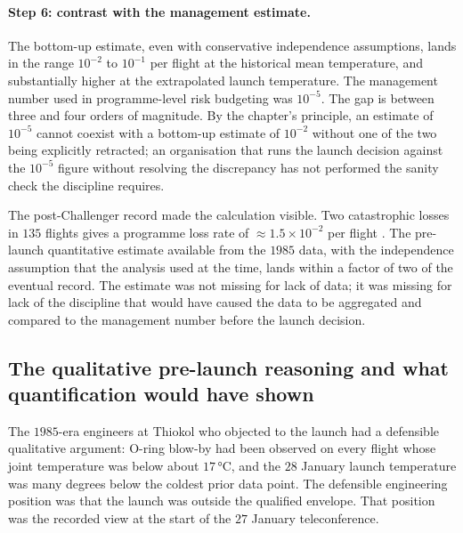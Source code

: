 \paragraph{Step 6: contrast with the management estimate.}
The bottom-up estimate, even with conservative independence
assumptions, lands in the range $10^{-2}$ to $10^{-1}$ per flight
at the historical mean temperature, and substantially higher at
the extrapolated launch temperature. The management number used in
programme-level risk budgeting was $10^{-5}$. The gap is between
three and four orders of magnitude. By the chapter's principle, an
estimate of $10^{-5}$ cannot coexist with a bottom-up estimate of
$10^{-2}$ without one of the two being explicitly retracted; an
organisation that runs the launch decision against the $10^{-5}$
figure without resolving the discrepancy has not performed the
sanity check the discipline requires.

The post-Challenger record made the calculation visible. Two
catastrophic losses in $135$ flights gives a programme loss rate of
$\approx 1.5 \times 10^{-2}$ per flight
\cite{acc:nasa-challenger,acc:caib-columbia}. The pre-launch
quantitative estimate available from the $1985$ data, with the
independence assumption that the analysis used at the time, lands
within a factor of two of the eventual record. The estimate was
not missing for lack of data; it was missing for lack of the
discipline that would have caused the data to be aggregated and
compared to the management number before the launch decision.

\subsection{The qualitative pre-launch reasoning and what
quantification would have shown}

The $1985$-era engineers at Thiokol who objected to the launch
had a defensible qualitative argument: O-ring blow-by had been
observed on every flight whose joint temperature was below about
$17 \,\si{\degreeCelsius}$, and the $28$ January launch
temperature was many degrees below the coldest prior data point.
The defensible engineering position was that the launch was
outside the qualified envelope. That position was the recorded
view at the start of the $27$ January teleconference.

